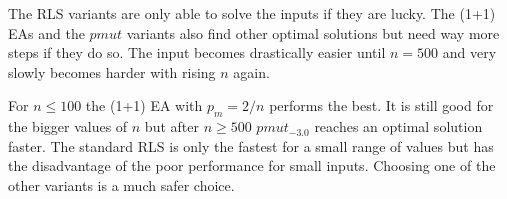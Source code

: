 

The RLS variants are only able to solve the inputs if they are lucky.
The (1+1) EAs and the $pmut$ variants also find other optimal solutions but need way more steps if they do so.
The input becomes drastically easier until $n=500$ and very slowly becomes harder with rising $n$ again.



For $n\le100$ the (1+1) EA with $p_m=2/n$ performs the best.
It is still good for the bigger values of $n$ but after $n\ge500$ $pmut_{-3.0}$ reaches an optimal solution faster.
The standard RLS is only the fastest for a small range of values but has the disadvantage of the poor performance for small inputs.
Choosing one of the other variants is a much safer choice.

